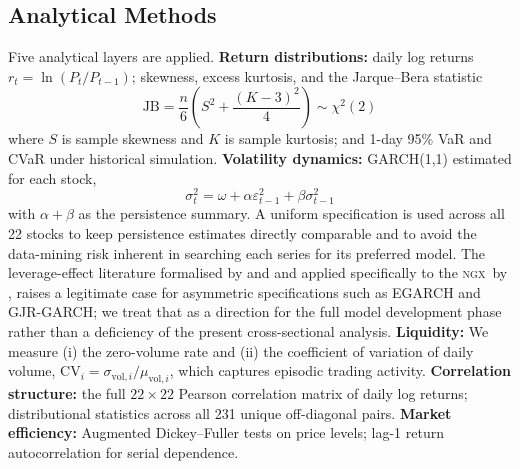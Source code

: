 \documentclass[twoside,11pt]{article}
\newcommand{\ngx}{\textsc{ngx}}
\begin{document}
	\subsection{Analytical Methods}
	
	Five analytical layers are applied. \textbf{Return distributions:}	daily log returns $r_t = \ln(P_t/P_{t-1})$; skewness, excess	kurtosis, and the Jarque--Bera statistic
	\begin{equation}
		\mathrm{JB} = \frac{n}{6}\!\left(S^2 + \frac{(K-3)^2}{4}\right)
		\sim \chi^2(2)
		\label{eq:jb}
	\end{equation}
	where $S$ is sample skewness and $K$ is sample kurtosis; and 1-day 95\% VaR and CVaR under historical simulation. \textbf{Volatility dynamics:} GARCH(1,1) estimated for each stock,
	\begin{equation}
		\sigma_t^2 = \omega + \alpha\varepsilon_{t-1}^2
		+ \beta\sigma_{t-1}^2
		\label{eq:garch}
	\end{equation}
	with $\alpha + \beta$ as the persistence summary. A uniform specification is used across all 22 stocks to keep persistence estimates directly comparable and to avoid the data-mining risk inherent in searching each series for its preferred model. The	leverage-effect literature formalised by \citet{nelson1991egarch}
	and \citet{glosten1993gjr} and applied specifically to the \ngx\ by \citet{adams2024asymmetric}, raises a legitimate case for	asymmetric specifications such as EGARCH and GJR-GARCH; we treat that as a direction for the full model development phase rather than a deficiency of the present cross-sectional analysis. \textbf{Liquidity:} We measure (i) the zero-volume rate and	(ii) the coefficient of variation of daily volume,
	$\mathrm{CV}_i = \sigma_{\mathrm{vol},i}/\mu_{\mathrm{vol},i}$, which captures episodic trading activity.
	\textbf{Correlation structure:} the full $22\times22$ Pearson	correlation matrix of daily log returns; distributional statistics across all 231 unique off-diagonal pairs. \textbf{Market efficiency:}
	Augmented Dickey--Fuller tests on price levels; lag-1 return autocorrelation for serial dependence.
	
\end{document}
